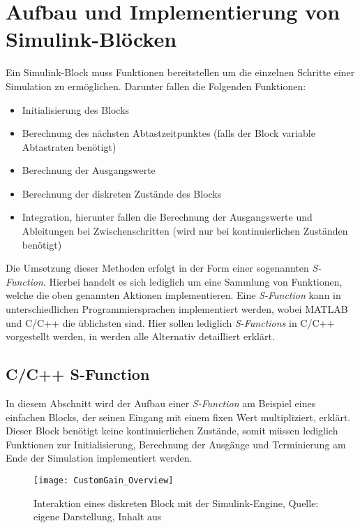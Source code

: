 \section{Aufbau und Implementierung von Simulink-Blöcken}
Ein Simulink-Block muss Funktionen bereitstellen um die einzelnen Schritte einer Simulation zu ermöglichen. Darunter fallen die Folgenden Funktionen:

\begin{itemize}
	\item Initialisierung des Blocks
	\item Berechnung des nächsten Abtastzeitpunktes (falls der Block variable Abtastraten benötigt)
	\item Berechnung der Ausgangswerte
	\item Berechnung der diskreten Zustände des Blocks
	\item Integration, hierunter fallen die Berechnung der Ausgangswerte und Ableitungen bei Zwischenschritten (wird nur bei kontinuierlichen Zuständen benötigt)
\end{itemize}

Die Umsetzung dieser Methoden erfolgt in der Form einer sogenannten \textit{S-Function}. Hierbei handelt es sich lediglich um eine Sammlung von Funktionen, welche die oben genannten Aktionen implementieren. Eine \textit{S-Function} kann in unterschiedlichen Programmiersprachen implementiert werden, wobei MATLAB und C/C++ die üblichsten sind. Hier sollen lediglich \textit{S-Functions} in C/C++ vorgestellt werden, in \cite{SFunc} werden alle Alternativ detailliert erklärt. 

\subsection{C/C++ S-Function}
In diesem Abschnitt wird der Aufbau einer \textit{S-Function} am Beispiel eines einfachen Blocks, der seinen Eingang mit einem fixen Wert multipliziert, erklärt. Dieser Block benötigt keine kontinuierlichen Zustände, somit müssen lediglich Funktionen zur Initialisierung, Berechnung der Ausgänge und Terminierung am Ende der Simulation implementiert werden.

\begin{figure}[h]
\label{CustomGain_Overview_pic}
	\texttt{[image: CustomGain\_Overview]}
	\caption{Interaktion eines diskreten Block mit der Simulink-Engine, Quelle: eigene Darstellung, Inhalt aus \cite{SFunc}}
\end{figure}

